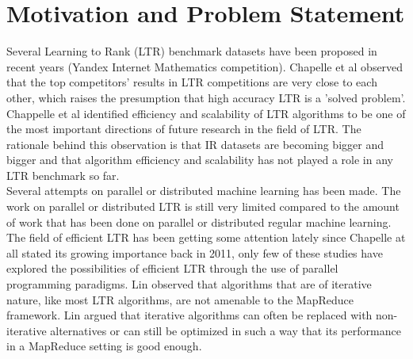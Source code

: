 \chapter{Motivation and Problem Statement}
Several Learning to Rank (LTR) benchmark datasets have been proposed in recent years \cite{Chapelle2011a,Qin2010,Alcantara2010} (Yandex Internet Mathematics competition). Chapelle et al \cite{Chapelle2011b} observed that the top competitors' results in LTR competitions are very close to each other, which raises the presumption that high accuracy LTR is a 'solved problem'.\\

Chappelle et al \cite{Chapelle2011b} identified efficiency and scalability of LTR algorithms to be one of the most important directions of future research in the field of LTR. The rationale behind this observation is that IR datasets are becoming bigger and bigger and that algorithm efficiency and scalability has not played a role in any LTR benchmark so far.\\

Several attempts on parallel or distributed machine learning \cite{Chu2007,Chang2007} has been made. The work on parallel or distributed LTR is still very limited compared to the amount of work that has been done on parallel or distributed regular machine learning. The field of efficient LTR has been getting some attention lately \cite{Asadi2013a,Asadi2013b,Busa-Fekete2012,Sousa2012,Shukla2012} since Chapelle at all \cite{Chapelle2011b} stated its growing importance back in 2011, only few of these studies \cite{Sousa2012,Shukla2012} have explored the possibilities of efficient LTR through the use of parallel programming paradigms. Lin \cite{Lin2013} observed that algorithms that are of iterative nature, like most LTR algorithms, are not amenable to the MapReduce framework. Lin \cite{Lin2013} argued that iterative algorithms can often be replaced with non-iterative alternatives or can still be optimized in such a way that its performance in a MapReduce setting is good enough.\\

